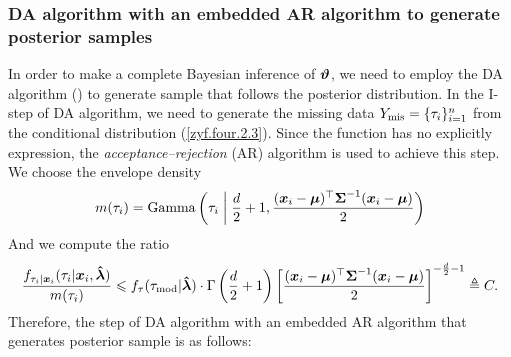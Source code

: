 \subsubsection{DA algorithm with an embedded AR algorithm to generate posterior samples}        %

In order to make a complete Bayesian inference of $\boldsymbol{\vartheta}$, we need to employ the DA algorithm (\cite{TW1987}) to generate sample that follows the posterior distribution. In the I-step of DA algorithm, we need to generate the missing data $Y_{\rm mis} = \{\tau_i\}_{i=1}^n$ from the conditional distribution (\ref{zyf.four.2.3}). Since the function has no explicitly expression, the \textit{acceptance--rejection} (AR) algorithm is used to achieve this step. We choose the envelope density
$$
    m(\tau_i) = \mbox{Gamma}\left(\tau_i \;\bigg|\; \frac{d}{2} + 1, \frac{({\boldsymbol{x}}_i - {\boldsymbol{\mu}})^\top {\mbox{\boldmath$\Sigma$}}^{-1} ({\boldsymbol{x}}_i - {\boldsymbol{\mu}})}{2}\right)
$$
And we compute the ratio
$$
    \frac{f_{\tau_i|{\boldsymbol{x}}_i}(\tau_i | {\boldsymbol{x}}_i, \mbox{\boldmath${\hat \lambda}$})}{m(\tau_i)} \leqslant f_\tau(\tau_{\rm mod} | \mbox{\boldmath${\hat \lambda}$}) \cdot \Gamma\left(\frac{d}{2} + 1\right) \left[\frac{({\boldsymbol{x}}_i - {\boldsymbol{\mu}})^\top {\mbox{\boldmath$\Sigma$}}^{-1} ({\boldsymbol{x}}_i - {\boldsymbol{\mu}})}{2}\right]^{-\frac{d}{2} - 1} \triangleq C.
$$
Therefore, the step of DA algorithm with an embedded AR algorithm that generates posterior sample is as follows:
\vkL
\IncMargin{0.1em}  %
